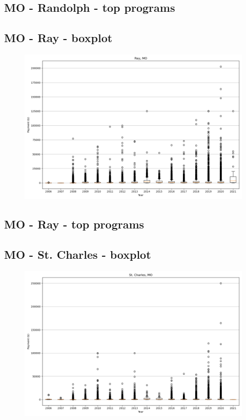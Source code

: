 \subsection*{MO - Randolph - top programs}

\newpage
\subsection*{MO - Ray - boxplot}
\begin{figure}[h]
\centering
\includegraphics[width=7in]{../output/boxplots/counties/Ray-MO_boxplot.png}
\end{figure}


\subsection*{MO - Ray - top programs}

\newpage
\subsection*{MO - St. Charles - boxplot}
\begin{figure}[h]
\centering
\includegraphics[width=7in]{../output/boxplots/counties/St. Charles-MO_boxplot.png}
\end{figure}


